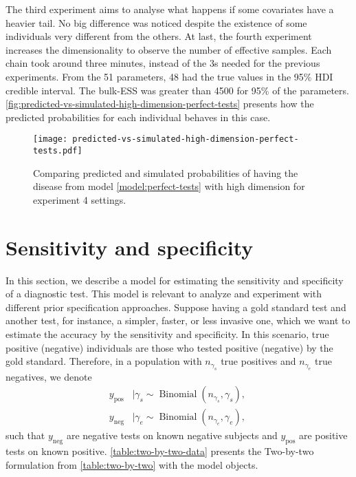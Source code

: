 The third experiment aims to analyse what happens if some covariates have a
heavier tail. No big difference was noticed despite the existence of some
individuals very different from the others. At last, the fourth experiment
increases the dimensionality to observe the number of effective samples. Each
chain took around three minutes, instead of the 3s needed for the previous
experiments. From the 51 parameters, 48 had the true values in the 95\% HDI
credible interval. The bulk-ESS was greater than 4500 for 95\% of the
parameters. \autoref{fig:predicted-vs-simulated-high-dimension-perfect-tests}
presents how the predicted probabilities for each individual behaves in this
case.

\begin{figure}[!hb]
  \centering
  \caption{\label{fig:predicted-vs-simulated-high-dimension-perfect-tests}
    Comparing predicted and simulated probabilities of having the disease from
    model \eqref{model:perfect-tests} with high dimension for experiment 4 settings.}
  \texttt{[image: predicted-vs-simulated-high-dimension-perfect-tests.pdf]}
\end{figure}

\section{Sensitivity and specificity}

In this section, we describe a model for estimating the sensitivity and
specificity of a diagnostic test. This model is relevant to analyze and
experiment with different prior specification approaches. Suppose having a
gold standard test and another test, for instance, a simpler, faster, or less
invasive one, which we want to estimate the accuracy by the sensitivity and
specificity. In this scenario,
true positive (negative) individuals are those who tested positive (negative) by
the gold standard. Therefore, in a population with $n_{\gamma_s}$ true
positives and  $n_{\gamma_e}$ true negatives, we denote
\begin{equation}
  \label{model:sensitivity-specificity}
  \begin{aligned}
    y_{\mathrm{pos}} & \mid \gamma_s \sim \operatorname{Binomial}(n_{\gamma_s}, \gamma_s),\ \\
    y_{\mathrm{neg}} & \mid \gamma_e \sim \operatorname{Binomial}(n_{\gamma_e}, \gamma_e),
  \end{aligned}
\end{equation}
such that $y_{\mathrm{neg}}$ are negative tests on known negative
subjects and $y_{\mathrm{pos}}$ are positive tests on
known positive. \autoref{table:two-by-two-data} presents the Two-by-two
formulation from \autoref{table:two-by-two} with the model objects. 


